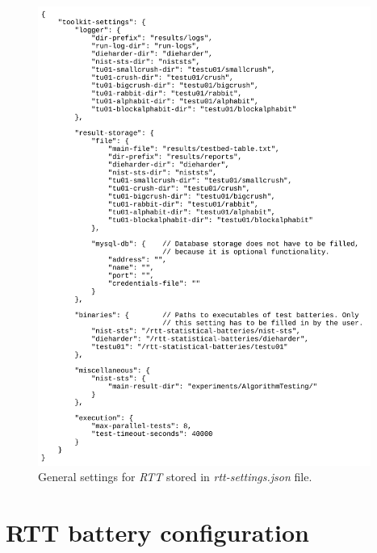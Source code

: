 \documentclass[
  digital,     %
  oneside,     %
  nosansbold,  %
  nocolorbold, %
  nolof,         %
  nolot,         %
]{fithesis4}
\begin{document}
\begin{figure}[h!]
  \begin{center}
    \includegraphics[width=10.9cm]{figures/rtt/rtt-settings.jpg}
  \end{center}
  \caption{General settings for \emph{RTT} stored in \emph{rtt-settings.json} file.}
  \label{fig:rtt_settings}
\end{figure}
\newpage


\section{RTT battery configuration} \label{append:rtt-config}
\end{document}
